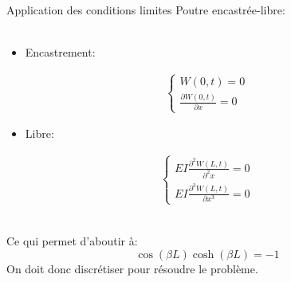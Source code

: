 \documentclass[xcolor=x11names,compress]{beamer}
\renewcommand{\(}{\begin{columns}}
\renewcommand{\)}{\end{columns}}
\newcommand{\<}[1]{\begin{column}{#1}}
\renewcommand{\>}{\end{column}}
\begin{document}
\begin{frame}{Application des conditions limites}
Poutre encastrée-libre:\\~\\

\begin{minipage}[t]{0.49\linewidth}
\begin{itemize}
	\item Encastrement:
\end{itemize} 
\begin{eqnarray*}
\begin{cases} W(0,t) = 0 \\ \frac{\partial W(0,t)}{\partial x} = 0 \end{cases}
\end{eqnarray*}
\end{minipage}
\begin{minipage}[t]{0.49\linewidth}
\begin{itemize}
	\item Libre:
\end{itemize}
\begin{eqnarray*}
\begin{cases}  EI \frac{\partial ^2 W(L,t)}{\partial ^2 x} = 0 \\ EI \frac{\partial ^3 W(L,t)}{\partial x^3} = 0 \end{cases}
\end{eqnarray*}
\end{minipage} \\ \bigskip
Ce qui permet d'aboutir à:
\begin{equation}
 \cos(\beta L) \cosh(\beta L) = -1
\end{equation}
On doit donc discrétiser pour résoudre le problème.
\end{frame}
\end{document}
